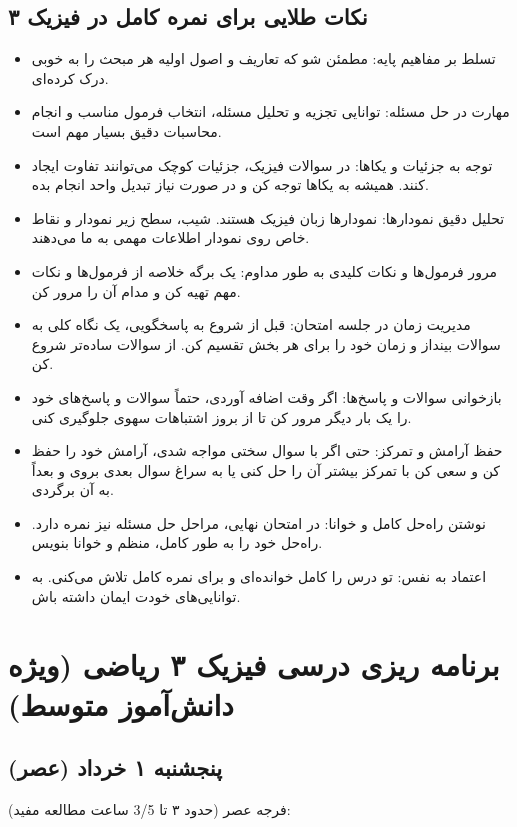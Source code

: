 \documentclass[12pt]{article}
\newcommand{\休息}[1]{\par\centering\textit{#1}\par\vspace{1ex}} %
\begin{document}
\subsection*{نکات طلایی برای نمره کامل در فیزیک ۳}
\begin{itemize}
    \item تسلط بر مفاهیم پایه: مطمئن شو که تعاریف و اصول اولیه هر مبحث را به خوبی درک کرده‌ای.
    \item مهارت در حل مسئله: توانایی تجزیه و تحلیل مسئله، انتخاب فرمول مناسب و انجام محاسبات دقیق بسیار مهم است.
    \item توجه به جزئیات و یکاها: در سوالات فیزیک، جزئیات کوچک می‌توانند تفاوت ایجاد کنند. همیشه به یکاها توجه کن و در صورت نیاز تبدیل واحد انجام بده.
    \item تحلیل دقیق نمودارها: نمودارها زبان فیزیک هستند. شیب، سطح زیر نمودار و نقاط خاص روی نمودار اطلاعات مهمی به ما می‌دهند.
    \item مرور فرمول‌ها و نکات کلیدی به طور مداوم: یک برگه خلاصه از فرمول‌ها و نکات مهم تهیه کن و مدام آن را مرور کن.
    \item مدیریت زمان در جلسه امتحان: قبل از شروع به پاسخگویی، یک نگاه کلی به سوالات بینداز و زمان خود را برای هر بخش تقسیم کن. از سوالات ساده‌تر شروع کن.
    \item بازخوانی سوالات و پاسخ‌ها: اگر وقت اضافه آوردی، حتماً سوالات و پاسخ‌های خود را یک بار دیگر مرور کن تا از بروز اشتباهات سهوی جلوگیری کنی.
    \item حفظ آرامش و تمرکز: حتی اگر با سوال سختی مواجه شدی، آرامش خود را حفظ کن و سعی کن با تمرکز بیشتر آن را حل کنی یا به سراغ سوال بعدی بروی و بعداً به آن برگردی.
    \item نوشتن راه‌حل کامل و خوانا: در امتحان نهایی، مراحل حل مسئله نیز نمره دارد. راه‌حل خود را به طور کامل، منظم و خوانا بنویس.
    \item اعتماد به نفس: تو درس را کامل خوانده‌ای و برای نمره کامل تلاش می‌کنی. به توانایی‌های خودت ایمان داشته باش.
\end{itemize}

\newpage %
\section*{برنامه ریزی درسی فیزیک ۳ ریاضی (ویژه دانش‌آموز متوسط)}

\subsection*{پنجشنبه ۱ خرداد (عصر)}
فرجه عصر (حدود ۳ تا 3/5 ساعت مطالعه مفید):
\end{document}
